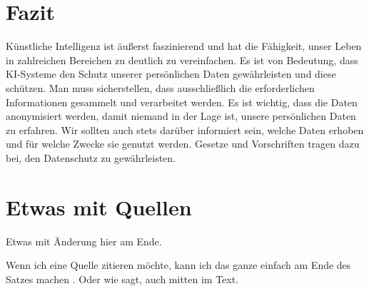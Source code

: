 \documentclass{report}
\begin{document}
\section{Fazit}
Künstliche Intelligenz ist äußerst faszinierend und hat die Fähigkeit, unser Leben in zahlreichen Bereichen zu deutlich zu vereinfachen.
Es ist von Bedeutung, dass KI-Systeme den Schutz unserer persönlichen Daten gewährleisten und diese schützen.
Man muss sicherstellen, dass ausschließlich die erforderlichen Informationen gesammelt und verarbeitet werden. Es ist wichtig, dass die Daten anonymisiert werden, damit niemand in der Lage ist, unsere persönlichen Daten zu erfahren. Wir sollten auch stets darüber informiert sein, welche Daten erhoben und für welche Zwecke sie genutzt werden.
Gesetze und Vorschriften tragen dazu bei, den Datenschutz zu gewährleisten.






\section{Etwas mit Quellen}

Etwas mit Änderung hier am Ende.

Wenn ich eine Quelle zitieren möchte, kann ich das ganze einfach am Ende des Satzes machen \citep{example}. Oder wie \citet{example} sagt, auch mitten im Text.

\printbibliography
\end{document}

